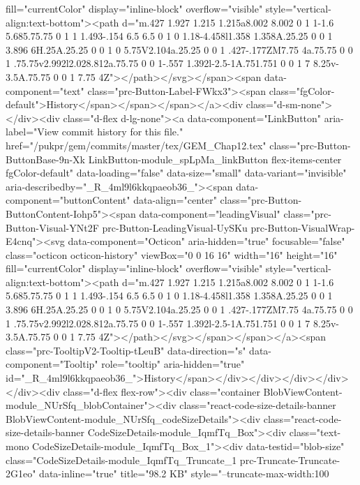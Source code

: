 fill="currentColor" display="inline-block" overflow="visible" style="vertical-align:text-bottom"><path d="m.427 1.927 1.215 1.215a8.002 8.002 0 1 1-1.6 5.685.75.75 0 1 1 1.493-.154 6.5 6.5 0 1 0 1.18-4.458l1.358 1.358A.25.25 0 0 1 3.896 6H.25A.25.25 0 0 1 0 5.75V2.104a.25.25 0 0 1 .427-.177ZM7.75 4a.75.75 0 0 1 .75.75v2.992l2.028.812a.75.75 0 0 1-.557 1.392l-2.5-1A.751.751 0 0 1 7 8.25v-3.5A.75.75 0 0 1 7.75 4Z"></path></svg></span><span data-component="text" class="prc-Button-Label-FWkx3"><span class="fgColor-default">History</span></span></span></a><div class="d-sm-none"></div><div class="d-flex d-lg-none"><a data-component="LinkButton" aria-label="View commit history for this file." href="/pukpr/gem/commits/master/tex/GEM_Chap12.tex" class="prc-Button-ButtonBase-9n-Xk LinkButton-module_spLpMa_linkButton flex-items-center fgColor-default" data-loading="false" data-size="small" data-variant="invisible" aria-describedby="_R_4ml9l6kkqpaeob36_"><span data-component="buttonContent" data-align="center" class="prc-Button-ButtonContent-Iohp5"><span data-component="leadingVisual" class="prc-Button-Visual-YNt2F prc-Button-LeadingVisual-UySKu prc-Button-VisualWrap-E4cnq"><svg data-component="Octicon" aria-hidden="true" focusable="false" class="octicon octicon-history" viewBox="0 0 16 16" width="16" height="16" fill="currentColor" display="inline-block" overflow="visible" style="vertical-align:text-bottom"><path d="m.427 1.927 1.215 1.215a8.002 8.002 0 1 1-1.6 5.685.75.75 0 1 1 1.493-.154 6.5 6.5 0 1 0 1.18-4.458l1.358 1.358A.25.25 0 0 1 3.896 6H.25A.25.25 0 0 1 0 5.75V2.104a.25.25 0 0 1 .427-.177ZM7.75 4a.75.75 0 0 1 .75.75v2.992l2.028.812a.75.75 0 0 1-.557 1.392l-2.5-1A.751.751 0 0 1 7 8.25v-3.5A.75.75 0 0 1 7.75 4Z"></path></svg></span></span></a><span class="prc-TooltipV2-Tooltip-tLeuB" data-direction="s" data-component="Tooltip" role="tooltip" aria-hidden="true" id="_R_4ml9l6kkqpaeob36_">History</span></div></div></div></div></div><div class="d-flex flex-row"><div class="container BlobViewContent-module_NUrSfq_blobContainer"><div class="react-code-size-details-banner BlobViewContent-module_NUrSfq_codeSizeDetails"><div class="react-code-size-details-banner CodeSizeDetails-module_IqmfTq_Box"><div class="text-mono CodeSizeDetails-module_IqmfTq_Box_1"><div data-testid="blob-size" class="CodeSizeDetails-module_IqmfTq_Truncate_1 prc-Truncate-Truncate-2G1eo" data-inline="true" title="98.2 KB" style="--truncate-max-width:100%